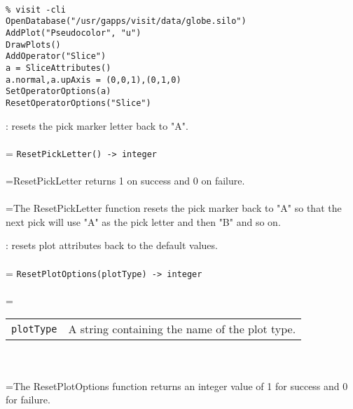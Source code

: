 \documentclass[10pt,a4paper]{report}
\begin{document}
\\[-6mm]
\begin{verbatim}% visit -cli
OpenDatabase("/usr/gapps/visit/data/globe.silo")
AddPlot("Pseudocolor", "u")
DrawPlots()
AddOperator("Slice")
a = SliceAttributes()
a.normal,a.upAxis = (0,0,1),(0,1,0)
SetOperatorOptions(a)
ResetOperatorOptions("Slice")
\end{verbatim}
\newpage


{}
: resets the pick marker letter back to "A".\\[-3mm]

 \\ 
\hangindent=\parindent 
\verb!ResetPickLetter() -> integer!\\ [-3mm]

 \\ 
\hangindent=\parindent ResetPickLetter returns 1 on success and 0 on failure. \\[-3mm] 

 \\ 
\hangindent=\parindent The ResetPickLetter function resets the pick marker back to "A" so that the next pick will use "A" as the pick letter and then "B" and so on. \\[-3mm] 

\newpage


{}
: resets plot attributes back to the default values.\\[-3mm]

 \\ 
\hangindent=\parindent 
\verb!ResetPlotOptions(plotType) -> integer!\\ [-3mm]

 \\ 
\hangindent=\parindent 
\begin{tabular}{lp{9cm}}
\verb!plotType! & A string containing the name of the plot type. \\
\end{tabular} \\[-2mm]


 \\ 
\hangindent=\parindent The ResetPlotOptions function returns an integer value of 1 for success and 0 for failure. \\[-3mm] 
\end{document}
